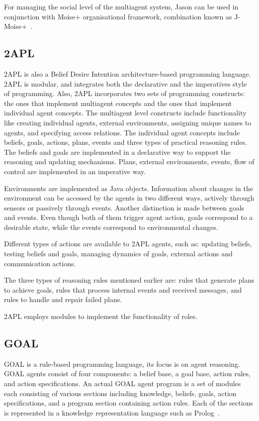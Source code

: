 \documentclass[a4paper,12pt,oneside,fleqn]{book} %
\begin{document}
For managing the social level of the multiagent system, Jason can be used
in conjunction with Moise+ organisational framework, combination known as
J-Moise+~\cite{hubner2007j}.


\subsection{2APL} %
2APL is also a Belief Desire Intention architecture-based programming
language. 2APL is modular, and integrates both the declarative and the
imperatives style of programming. Also, 2APL incorporates two sets of
programming constructs: the ones that implement multiagent concepts and the
ones that implement individual agent concepts. The multiagent level
constructs include functionality like creating individual agents, external
environments, assigning unique names to agents, and specifying access
relations. The individual agent concepts include beliefs, goals, actions,
plans, events and three types of practical reasoning rules. The beliefs and
goals are implemented in a declarative way to support the reasoning and
updating mechanisms. Plans, external environments, events, flow of control
are implemented in an imperative way.

Environments are implemented as Java objects. Information about changes in
the environment can be accessed by the agents in two different ways,
actively through sensors or passively through events. Another distinction
is made between goals and events. Even though both of them trigger agent
action, goals correspond to a desirable state, while the events correspond
to environmental changes.

Different types of actions are available to 2APL agents, such as: updating
beliefs, testing beliefs and goals, managing dynamics of goals, external
actions and communication actions.

The three types of reasoning rules mentioned earlier are: rules that
generate plans to achieve goals, rules that process internal events and
received messages, and rules to handle and repair failed plans.

2APL employs modules to implement the functionality of roles.

\subsection{GOAL} %
GOAL is a rule-based programming language, its focus is on agent reasoning.
GOAL agents consist of four components: a belief base, a goal base, action
rules, and action specifications. An actual GOAL agent program is a set of
modules each consisting of various sections including knowledge, beliefs,
goals, action specifications, and a program section containing action
rules. Each of the sections is represented in a knowledge representation
language such as Prolog~\cite{DBLP:books/daglib/0076175}.
\end{document}

